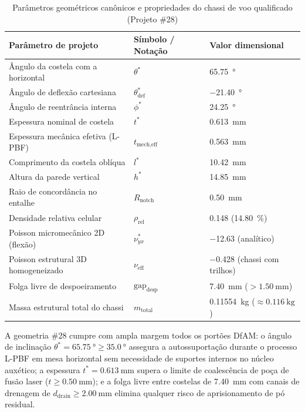 \begin{table}[htb]
  \caption{Parâmetros geométricos canônicos e propriedades do chassi de voo qualificado (Projeto \#28)}
  \label{tab:res-optimo}
  \centering
  \small
  \SingleSpacing
  \begin{tabularx}{0.88\textwidth}{@{}>{\raggedright\arraybackslash}X >{\centering\arraybackslash}p{3.2cm} >{\centering\arraybackslash}p{3.8cm}@{}}
    \toprule
    \textbf{Parâmetro de projeto} & \textbf{Símbolo / Notação} & \textbf{Valor dimensional} \\
    \midrule
    Ângulo da costela com a horizontal & $\theta^*$           & \SI{65.75}{\degree} \\
    Ângulo de deflexão cartesiana      & $\theta_{\text{def}}^*$ & \SI{-21.40}{\degree} \\
    Ângulo de reentrância interna      & $\phi^*$            & \SI{24.25}{\degree} \\
    Espessura nominal de costela       & $t^*$                & \SI{0.613}{\milli\metre} \\
    Espessura mecânica efetiva (L-PBF) & $t_{\text{mech,eff}}$ & \SI{0.563}{\milli\metre} \\
    Comprimento da costela oblíqua     & $l^*$                & \SI{10.42}{\milli\metre} \\
    Altura da parede vertical          & $h^*$                & \SI{14.85}{\milli\metre} \\
    Raio de concordância no entalhe    & $R_{\text{notch}}$    & \SI{0.50}{\milli\metre} \\
    \midrule
    Densidade relativa celular         & $\rho_{\text{rel}}$  & \num{0.148} (\SI{14.80}{\percent}) \\
    Poisson micromecânico 2D (flexão)  & $\nu_{yx}^*$         & \num{-12.63} (analítico) \\
    Poisson estrutural 3D homogeneizado & $\nu_{\text{eff}}$   & \num{-0.428} (chassi com trilhos) \\
    Folga livre de despoeiramento      & $\text{gap}_{\text{desp}}$ & \SI{7.40}{\milli\metre} ($> \SI{1.50}{\milli\metre}$) \\
    Massa estrutural total do chassi   & $m_{\text{total}}$   & \SI{0.11554}{\kilo\gram} ($\approx \SI{0.116}{\kilo\gram}$) \\
    \bottomrule
  \end{tabularx}
\end{table}

A geometria \#28 cumpre com ampla margem todos os portões DfAM: o ângulo de inclinação $\theta^* = \SI{65.75}{\degree} \ge \SI{35.0}{\degree}$ assegura a autossuportação durante o processo L-PBF em mesa horizontal sem necessidade de suportes internos no núcleo auxético; a espessura $t^* = \SI{0.613}{\milli\metre}$ supera o limite de coalescência de poça de fusão laser ($t \ge \SI{0.50}{\milli\metre}$); e a folga livre entre costelas de \SI{7.40}{\milli\metre} com canais de drenagem de $d_{\text{drain}} \ge \SI{2.00}{\milli\metre}$ elimina qualquer risco de aprisionamento de pó residual.

